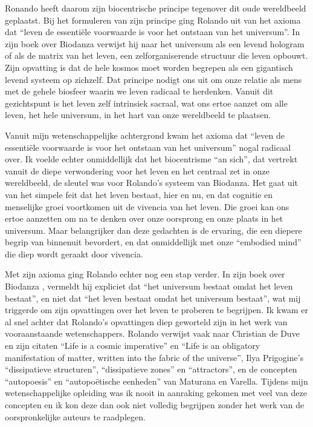 \documentclass[
  11pt,
]{book}
\begin{document}
Ronando heeft daarom zijn biocentrische principe tegenover dit oude wereldbeeld geplaatst. Bij het formuleren van zijn principe ging Rolando uit van het axioma dat ``leven de essentiële voorwaarde is voor het ontstaan van het universum''. In zijn boek over Biodanza \citep{toro2008} verwijst hij naar het universum als een levend hologram of als de matrix van het leven, een zelforganiserende structuur die leven opbouwt. Zijn opvatting is dat de hele kosmos moet worden begrepen als een gigantisch levend systeem op zichzelf. Dat principe nodigt ons uit om onze relatie als mens met de gehele biosfeer waarin we leven radicaal te herdenken. Vanuit dit gezichtspunt is het leven zelf intrinsiek sacraal, wat ons ertoe aanzet om alle leven, het hele universum, in het hart van onze wereldbeeld te plaatsen.

Vanuit mijn wetenschappelijke achtergrond kwam het axioma dat ``leven de essentiële voorwaarde is voor het ontstaan van het universum'' nogal radicaal over. Ik voelde echter onmiddellijk dat het biocentrisme ``an sich'', dat vertrekt vanuit de diepe verwondering voor het leven en het centraal zet in onze wereldbeeld, de sleutel was voor Rolando's systeem van Biodanza. Het gaat uit van het simpele feit dat het leven bestaat, hier en nu, en dat cognitie en menselijke groei voortkomen uit de vivencia van het leven. Die groei kan ons ertoe aanzetten om na te denken over onze oorsprong en onze plaats in het universum. Maar belangrijker dan deze gedachten is de ervaring, die een diepere begrip van binnenuit bevordert, en dat onmiddellijk met onze ``embodied mind'' die diep wordt geraakt door vivencia.

Met zijn axioma ging Rolando echter nog een stap verder. In zijn boek over Biodanza \citep{toro2008}, vermeldt hij expliciet dat ``het universum bestaat omdat het leven bestaat'', en niet dat ``het leven bestaat omdat het universum bestaat'', wat mij triggerde om zijn opvattingen over het leven te proberen te begrijpen. Ik kwam er al snel achter dat Rolando's opvattingen diep geworteld zijn in het werk van vooraanstaande wetenschappers. Rolando verwijst vaak naar Christian de Duve en zijn citaten ``Life is a cosmic imperative'' en ``Life is an obligatory manifestation of matter, written into the fabric of the universe'', Ilya Prigogine's ``dissipatieve structuren'', ``dissipatieve zones'' en ``attractors'', en de concepten ``autopoesis'' en ``autopoëtische eenheden'' van Maturana en Varella. Tijdens mijn wetenschappelijke opleiding was ik nooit in aanraking gekomen met veel van deze concepten en ik kon deze dan ook niet volledig begrijpen zonder het werk van de oorspronkelijke auteurs te raadplegen.
\end{document}
